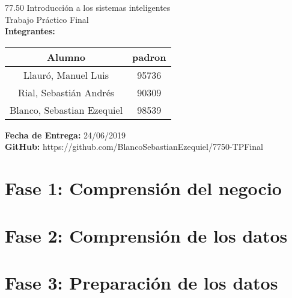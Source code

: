
%

		
	\begin{titlepage}
		\vspace*{\fill}
		\begin{center}
			\Large 77.50 Introducción a los sistemas inteligentes \\
			\Huge Trabajo Práctico Final\\
			\bigskip\bigskip\bigskip
			\large\textbf{Integrantes:} \\
			\begin{center}
				\begin{tabular}{||c | c||} 
					\hline
					Alumno & padron \\ [0.5ex] 
					\hline\hline
					Llauró, Manuel Luis & 95736 \\
					\hline
					Rial, Sebastián Andrés & 90309 \\
					\hline
					Blanco, Sebastian Ezequiel & 98539 \\
					\hline
				\end{tabular}
			\end{center}
			\textbf{Fecha de Entrega:} 24/06/2019\\
			\textbf{GitHub:} https://github.com/BlancoSebastianEzequiel/7750-TPFinal\\

		\end{center}
		\vspace*{\fill}
	\end{titlepage}
	\newpage
			
	\tableofcontents
	\newpage
	\section{Fase 1: Comprensión del negocio}
		

	\newpage
	\section{Fase 2: Comprensión de los datos}
		

	\newpage
	\section{Fase 3: Preparación de los datos}
		

